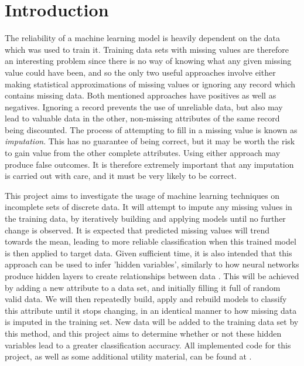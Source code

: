 \newpage
\chapter{Introduction}
The reliability of a machine learning model is heavily dependent on the data which was used to train it. Training data sets with missing values are therefore an interesting problem since there is no way of knowing what any given missing value could have been, and so the only two useful approaches involve either making statistical approximations of missing values or ignoring any record which contains missing data. Both mentioned approaches have positives as well as negatives. Ignoring a record prevents the use of unreliable data, but also may lead to valuable data in the other, non-missing attributes of the same record being discounted. The process of attempting to fill in a missing value is known as \textit{imputation}. This has no guarantee of being correct, but it may be worth the risk to gain value from the other complete attributes.  Using either approach may produce false outcomes. It is therefore extremely important that any imputation is carried out with care, and it must be very likely to be correct.

This project aims to investigate the usage of machine learning techniques on incomplete sets of discrete data. It will attempt to impute any missing values in the training data, by iteratively building and applying models until no further change is observed. It is expected that predicted missing values will trend towards the mean, leading to more reliable classification when this trained model is then applied to target data.  Given sufficient time, it is also intended that this approach can be used to infer 'hidden variables', similarly to how neural networks produce hidden layers to create relationships between data \cite{Touretzky:1989}. This will be achieved by adding a new attribute to a data set, and initially filling it full of random valid data. We will then repeatedly build, apply and rebuild models to classify this attribute until it stops changing, in an identical manner to how missing data is imputed in the training set. New data will be added to the training data set by this method, and this project aims to determine whether or not these hidden variables lead to a greater classification accuracy. All implemented code for this project, as well as some additional utility material, can be found at \cite{gitlab}.
